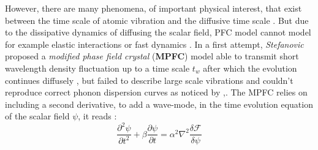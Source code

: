 \documentclass[11pt]{article}
\begin{document}
However, there are many phenomena, of important physical interest, that exist between the time scale of atomic vibration and the diffusive time scale \parencite{stefanovicPhaseFieldCrystals2006}. But due to the dissipative dynamics of diffusing the scalar field, PFC model cannot model for example elastic interactions or fast dynamics \parencite{heinonenConsistentHydrodynamics2016}. In a first attempt, \emph{Stefanovic} proposed a \emph{modified phase field crystal} (\textbf{MPFC}) model able to transmit short wavelength density fluctuation up to a time scale $t_w$ after which the evolution continues diffusely \parencite{stefanovicPhaseFieldCrystals2006}, but failed to describe large scale vibrations and couldn't reproduce correct phonon dispersion curves as noticed by \parencite{majaniemiDissipativephenomena2007},\parencite{majaniemiFirstprinciplesphenomenological2008}. The MPFC relies on including a second derivative, to add a wave-mode, in the time evolution equation of the scalar field $\psi$, it reads :
\begin{equation}
    \frac{\partial ^2\psi}{\partial t^2} + \beta \frac{\partial \psi}{\partial t} = \alpha^2 \nabla^2 \frac{\delta \mathcal{F}}{\delta \psi}
\end{equation}
\end{document}
